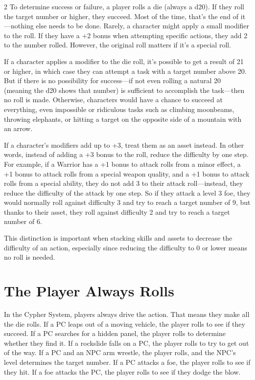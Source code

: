 \begin{multicols}{2}
To determine success or failure, a player rolls a die (always a d20). If they roll the target number or higher, they succeed. Most of the time, that’s the end of it—nothing else needs to be done. Rarely, a character might apply a small modifier to the roll. If they have a +2 bonus when attempting specific actions, they add 2 to the number rolled. However, the original roll matters if it’s a special roll.

If a character applies a modifier to the die roll, it’s possible to get a result of 21 or higher, in which case they can attempt a task with a target number above 20. But if there is no possibility for success—if not even rolling a natural 20 (meaning the d20 shows that number) is sufficient to accomplish the task—then no roll is made. Otherwise, characters would have a chance to succeed at everything, even impossible or ridiculous tasks such as climbing moonbeams, throwing elephants, or hitting a target on the opposite side of a mountain with an arrow.

If a character’s modifiers add up to +3, treat them as an asset instead. In other words, instead of adding a +3 bonus to the roll, reduce the difficulty by one step. For example, if a Warrior has a +1 bonus to attack rolls from a minor effect, a +1 bonus to attack rolls from a special weapon quality, and a +1 bonus to attack rolls from a special ability, they do not add 3 to their attack roll—instead, they reduce the difficulty of the attack by one step. So if they attack a level 3 foe, they would normally roll against difficulty 3 and try to reach a target number of 9, but thanks to their asset, they roll against difficulty 2 and try to reach a target number of 6.

This distinction is important when stacking skills and assets to decrease the difficulty of an action, especially since reducing the difficulty to 0 or lower means no roll is needed.

\section{The Player Always Rolls}

In the Cypher System, players always drive the action. That means they make all the die rolls. If a PC leaps out of a moving vehicle, the player rolls to see if they succeed. If a PC searches for a hidden panel, the player rolls to determine whether they find it. If a rockslide falls on a PC, the player rolls to try to get out of the way. If a PC and an NPC arm wrestle, the player rolls, and the NPC’s level determines the target number. If a PC attacks a foe, the player rolls to see if they hit. If a foe attacks the PC, the player rolls to see if they dodge the blow.


\end{multicols}
